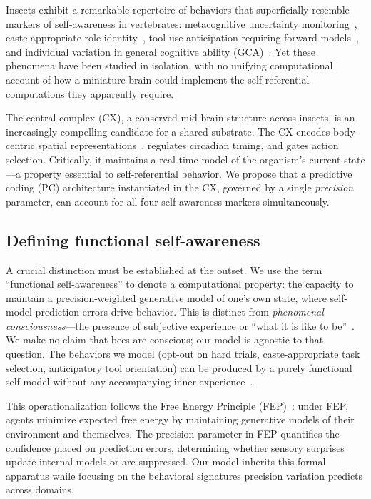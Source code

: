 Insects exhibit a remarkable repertoire of behaviors that superficially resemble markers of self-awareness in vertebrates:
metacognitive uncertainty monitoring~\cite{Giurfa2013}, caste-appropriate role identity~\cite{SciAdv2024Caste},
tool-use anticipation requiring forward models~\cite{NaturePuzzle2024}, and individual variation in general cognitive
ability (GCA)~\cite{AnimalCog2024}. Yet these phenomena have been studied in isolation, with no unifying computational
account of how a miniature brain could implement the self-referential computations they apparently require.

The central complex (CX), a conserved mid-brain structure across insects, is an increasingly compelling candidate for
a shared substrate. The CX encodes body-centric spatial representations~\cite{Stone2017CX}, regulates circadian
timing, and gates action selection. Critically, it maintains a real-time model of the organism's current state---a
property essential to self-referential behavior. We propose that a predictive coding (PC) architecture
instantiated in the CX, governed by a single \emph{precision} parameter, can account for all four self-awareness
markers simultaneously.

\subsection*{Defining functional self-awareness}

A crucial distinction must be established at the outset. We use the term ``functional self-awareness'' to denote a
computational property: the capacity to maintain a precision-weighted generative model of one's own state, where
self-model prediction errors drive behavior. This is distinct from \emph{phenomenal consciousness}---the presence of
subjective experience or ``what it is like to be''~\cite{Metzinger2003}. We make no claim that bees are conscious;
our model is agnostic to that question. The behaviors we model (opt-out on hard trials, caste-appropriate task
selection, anticipatory tool orientation) can be produced by a purely functional self-model without any accompanying
inner experience~\cite{Barron2016}.

This operationalization follows the Free Energy Principle (FEP)~\cite{Friston2010}: under FEP, agents
minimize expected free energy by maintaining generative models of their environment and themselves. The precision
parameter in FEP quantifies the confidence placed on prediction errors, determining whether sensory surprises
update internal models or are suppressed. Our model inherits this formal apparatus while focusing on the behavioral
signatures precision variation predicts across domains.

